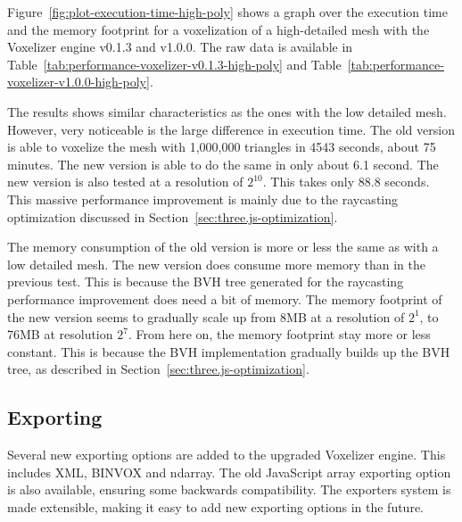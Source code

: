 Figure~\ref{fig:plot-execution-time-high-poly} shows a graph over the execution time and the memory footprint for a voxelization of a high-detailed mesh with the Voxelizer engine v0.1.3 and v1.0.0. The raw data is available in Table~\ref{tab:performance-voxelizer-v0.1.3-high-poly} and Table~\ref{tab:performance-voxelizer-v1.0.0-high-poly}.

The results shows similar characteristics as the ones with the low detailed mesh. However, very noticeable is the large difference in execution time. The old version is able to voxelize the mesh with 1,000,000 triangles in 4543 seconds, about 75 minutes. The new version is able to do the same in only about 6.1 second. The new version is also tested at a resolution of $2^{10}$. This takes only 88.8 seconds. This massive performance improvement is mainly due to the raycasting optimization discussed in Section~\ref{sec:three.js-optimization}.

The memory consumption of the old version is more or less the same as with a low detailed mesh. The new version does consume more memory than in the previous test. This is because the BVH tree generated for the raycasting performance improvement does need a bit of memory. The memory footprint of the new version seems to gradually scale up from 8MB at a resolution of $2^1$, to 76MB at resolution $2^7$. From here on, the memory footprint stay more or less constant. This is because the BVH implementation gradually builds up the BVH tree, as described in Section~\ref{sec:three.js-optimization}.

\subsection{Exporting}
Several new exporting options are added to the upgraded Voxelizer engine. This includes XML, BINVOX and ndarray. The old JavaScript array exporting option is also available, ensuring some backwards compatibility. The exporters system is made extensible, making it easy to add new exporting options in the future.


